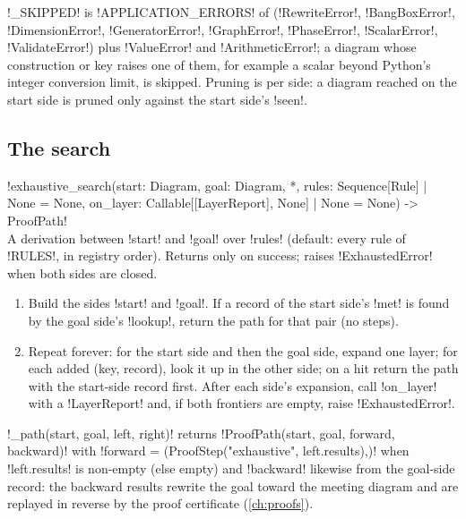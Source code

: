 \py!_SKIPPED! is \py!APPLICATION_ERRORS! of  (\py!RewriteError!,
\py!BangBoxError!, \py!DimensionError!, \py!GeneratorError!, \py!GraphError!, \py!PhaseError!,
\py!ScalarError!, \py!ValidateError!) plus \py!ValueError! and \py!ArithmeticError!; a diagram whose
construction or key raises one of them, for example a scalar beyond Python's integer conversion
limit, is skipped. Pruning is per side: a diagram reached on the start side is pruned only against
the start side's \py!seen!.

\subsection{The search}

\begin{signature}
\py!exhaustive_search(start: Diagram, goal: Diagram, *, rules: Sequence[Rule] | None = None, on_layer: Callable[[LayerReport], None] | None = None) -> ProofPath!\\
A derivation between \py!start! and \py!goal! over \py!rules! (default: every rule of \py!RULES!,
in registry order). Returns only on success; raises \py!ExhaustedError! when both sides are closed.
\end{signature}

\begin{algorithm}\label{alg:completeness-search}
\begin{enumerate}
\item Build the sides \code!start! and \code!goal!. If a record of the start side's \py!met! is
  found by the goal side's \py!lookup!, return the path for that pair (no steps).
\item Repeat forever: for the start side and then the goal side, expand one layer; for each added
  (key, record), look it up in the other side; on a hit return the path with the start-side record
  first. After each side's expansion, call \py!on_layer! with a \py!LayerReport! and, if both
  frontiers are empty, raise \py!ExhaustedError!.
\end{enumerate}
\end{algorithm}

\py!_path(start, goal, left, right)! returns \py!ProofPath(start, goal, forward, backward)! with
\py!forward = (ProofStep("exhaustive", left.results),)! when \py!left.results! is non-empty (else
empty) and \py!backward! likewise from the goal-side record: the backward results rewrite the goal
toward the meeting diagram and are replayed in reverse by the proof certificate (\cref{ch:proofs}).

